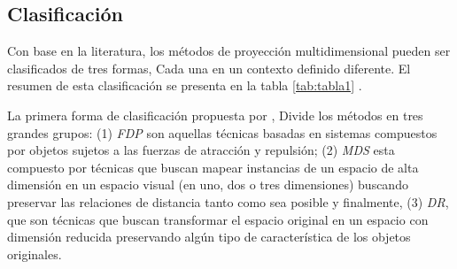 \subsection{Clasificación}
Con base en la literatura, los métodos de proyección multidimensional pueden ser clasificados de tres formas, Cada una en un contexto  definido diferente. El resumen de esta clasificación se presenta en la tabla \ref{tab:tabla1} . 

La primera forma de clasificación propuesta por \cite{paulovich2008mapeamento}, Divide los métodos en tres grandes grupos: (1) \emph{\ac{FDP}} son aquellas técnicas basadas en sistemas compuestos por objetos sujetos a las fuerzas de atracción y repulsión; (2) \emph{\ac{MDS}} esta compuesto por técnicas que buscan mapear instancias de un espacio de alta dimensión en un espacio visual (en uno, dos o tres dimensiones) buscando preservar las relaciones de distancia tanto como sea posible y finalmente, (3) \emph{\ac{DR}}, que son técnicas que buscan transformar el espacio original en un espacio con dimensión reducida preservando algún tipo de característica de los objetos originales.

